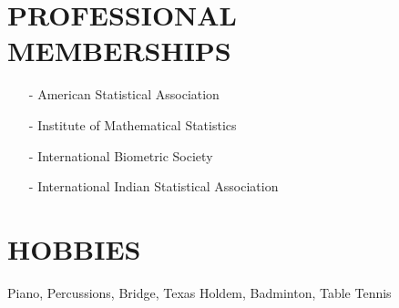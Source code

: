 \documentclass[11pt]{res} %
\begin{document}
\begin{resume}
\section{PROFESSIONAL MEMBERSHIPS}
\begin{itemize}[leftmargin=*] \itemsep -2pt
\item[-] American Statistical Association
\item[-] Institute of Mathematical Statistics
\item[-] International Biometric Society
\item[-] International Indian Statistical Association 
\end{itemize}

\section{HOBBIES} 
Piano, Percussions, Bridge, Texas Holdem, Badminton, Table Tennis
 
\end{resume}
\end{document}
